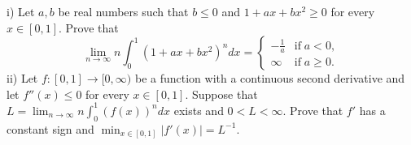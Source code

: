 i) Let $a,b$ be real numbers such that $b\leq 0$ and $1+ax+bx^{2} \geq 0$ for every $x\in [0,1]$.
Prove that
$$\lim_{n\to \infty} n \int_{0}^{1}(1+ax+bx^{2})^{n}dx= \begin{cases}
-\frac{1}{a} &\text{if}\; a<0,\\
 \infty & \text{if}\; a \geq 0.
\end{cases}$$ii) Let $f:[0,1]\rightarrow[0,\infty)$ be a function with a continuous second derivative and let $f''(x)\leq0$ for every $x\in [0,1]$. Suppose that $L=\lim_{n\to \infty} n \int_{0}^{1}(f(x))^{n}dx$ exists and $0<L<\infty$. Prove that $f'$ has a constant sign and  $\min_{x\in [0,1]}|f'(x)|=L^{-1}$.